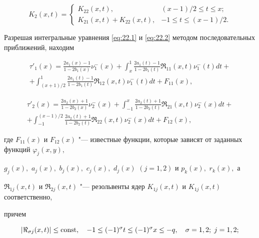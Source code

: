 $$

{K_2}(x,t) = \left\{\begin{array}{cl}

{K_{22}}(x,t), & ({{x - 1}})/{2} \le t \le x;\\

{K_{21}}(x,t) + {K_{22}}(x,t), & - 1 \le t \le ({{x - 1}})/{2}.

\end{array}\right.

$$



Разрешая интегральные уравнения \eqref{eq:22.1} и \eqref{eq:22.2} методом последовательных приближений, находим

\begin{multline}

{\tau '_1}(x) = \frac{{2{a_1}(x) - 1}}{{1 - 2{b_1}(x)}}\nu _1^ - (x) +  \int _x^1 {\frac{{2{a_1}(t) - 1}}{{1 - 2{b_1}(t)}}{\Re _{11}}(x,t)\nu _1^ - (t)dt} +

\\

+  \int _{({{x + 1}})/{2}}^1 \frac{{2{a_1}(t) - 1}}{{1 - 2{b_1}(t)}}{\Re _{12}}(x,t)\nu _1^ - (t)dt +  {F_{11}}(x), \label{eq:27.1}

\end{multline}

\begin{multline}

{\tau '_2}(x) = \frac{{2{a_2}(x) + 1}}{{1 - 2{b_2}(x)}}\nu _2^ - (x) +  \int _{ - 1}^x \frac{{2{a_2}(t) + 1}}{{1 - 2{b_2}(t)}}{\Re _{21}}(x,t)\nu _2^ - (x)dt+

\\

+ \int _{ - 1}^{({{x - 1}})/{2}} \frac{{2{a_2}(t) + 1}}{{1 - 2{b_2}(t)}}{\Re _{22}}(x,t)\nu _2^ - (x)dt +  {F_{12}}(x), \label{eq:27.2}

\end{multline}

где ${F_{11}}(x)$ и ${F_{12}}(x)$ "--- известные функции, которые зависят от заданных функций ${\varphi _j}(x,y),$  

${g_j}(x),$  ${a_j}(x),$ ${b_j}(x),$ ${c_j}(x),$ ${d_j}(x)$ $( j = 1, 2)$ и $p_k(x),$ $r_k (x),$ а 

${\Re _{1j}}(x,t)$ и ${\Re _{2j}}(x,t)$ "--- резольвенты ядер ${K_{1j}}(x,t)$  и ${K_{1j}}(x,t)$ соответственно,  

причем

\begin{equation}

| \Re _{\sigma j} (x,t) | \le {\rm const}, \quad  

-1\leq (-1)^{\sigma}t\leq (-1)^{\sigma}x\leq -q, \quad  \sigma= 1, 2;  \; j = 1, 2; \label{eq:28.j}

\end{equation}

